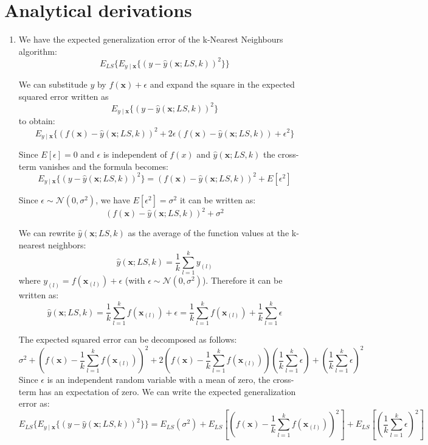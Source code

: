 \documentclass[a4paper,10pt]{article}
\begin{document}
\section{Analytical derivations}
\begin{enumerate}
    \item 
    We have the expected generalization error of the k-Nearest Neighbours algorithm:
    $$
    E_{LS}\{E_{y\mid \textbf{x}}\{(y - \hat{y}(\textbf{x};LS,k))^2\}\}
    $$
    
    We can substitude $y$ by $f(\textbf{x}) + \epsilon$ and expand the square in the expected squared error written as
    $$
    E_{y\mid \textbf{x}}\{(y - \hat{y}(\textbf{x};LS,k))^2\}
    $$
    to obtain:
    $$
    E_{y\mid \textbf{x}}\{(f(\textbf{x}) - \hat{y}(\textbf{x};LS,k))^2 + 2\epsilon(f(\textbf{x})-\hat{y}(\textbf{x};LS,k)) + \epsilon^2\}
    $$

    Since $E[\epsilon] = 0$ and $\epsilon$ is independent of $f(x)$ and $\hat{y}(\textbf{x};LS,k)$ the cross-term vanishes and the formula becomes:
    $$
    E_{y\mid \textbf{x}}\{(y - \hat{y}(\textbf{x};LS,k))^2\} = (f(\textbf{x})-\hat{y}(\textbf{x};LS,k))^2 + E[\epsilon^2]
    $$

    Since $\epsilon \sim \mathcal{N}(0, \sigma^2)$, we have $E[\epsilon^2] = \sigma^2$ it can be written as:
    $$
    (f(\textbf{x})-\hat{y}(\textbf{x};LS,k))^2 + \sigma^2
    $$

    We can rewrite $\hat{y}(\textbf{x};LS,k)$ as the average of the function values at the k-nearest neighbors:
    $$
    \hat{y}(\textbf{x};LS, k) = \frac{1}{k}\sum^k_{l=1}y_{(l)}
    $$
    where $y_{(l)} = f(\textbf{x}_{(l)}) + \epsilon$ (with $\epsilon \sim \mathcal{N}(0, \sigma^2)$). Therefore it can be written as:
    $$
    \hat{y}(\textbf{x};LS, k) = \frac{1}{k}\sum^k_{l=1}f(\textbf{x}_{(l)}) + \epsilon = \frac{1}{k}\sum^k_{l=1}f(\textbf{x}_{(l)}) + \frac{1}{k}\sum^k_{l=1}\epsilon
    $$

    The expected squared error can be decomposed as follows:
    $$
    \sigma^2  
    + \left(f(\textbf{x})-\frac{1}{k}\sum^k_{l=1}f(\textbf{x}_{(l)})\right)^2
    + 2\left(f(\textbf{x})-\frac{1}{k}\sum^k_{l=1}f(\textbf{x}_{(l)})\right) \left(\frac{1}{k}\sum^k_{l=1}\epsilon\right)
    + \left(\frac{1}{k}\sum^k_{l=1}\epsilon\right)^2
    $$
    Since $\epsilon$ is an independent random variable with a mean of zero, the cross-term has an expectation of zero. We can write the expected generalization error as:
    $$
    E_{LS}\{E_{y\mid \textbf{x}}\{(y - \hat{y}(\textbf{x};LS,k))^2\}\} =
    E_{LS}\left(\sigma^2\right)
    + E_{LS}\left[\left(f(\textbf{x})-\frac{1}{k}\sum^k_{l=1}f(\textbf{x}_{(l)})\right)^2\right]
    + E_{LS}\left[\left(\frac{1}{k}\sum^k_{l=1}\epsilon\right)^2\right]
    $$


\end{enumerate}
\end{document}
